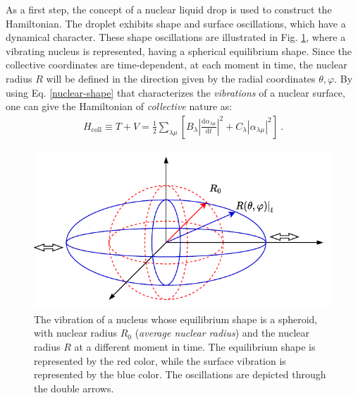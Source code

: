 As a first step, the concept of a nuclear liquid drop is used to construct the Hamiltonian. The droplet exhibits shape and surface oscillations, which have a dynamical character. These shape oscillations are illustrated in Fig. \ref{fig-nuclear-vibration}, where a vibrating nucleus is represented, having a spherical equilibrium shape. Since the collective coordinates are time-dependent, at each moment in time, the nuclear radius $R$ will be defined in the direction given by the radial coordinates $\theta,\varphi$. By using Eq. \ref{nuclear-shape} that characterizes the \emph{vibrations} of a nuclear surface, one can give the Hamiltonian of \emph{collective} nature as:
\begin{align}
    H_\text{coll}\equiv T+V=\frac{1}{2}\sum_{\lambda\mu}\left[B_\lambda\left|\frac{\text{d}\alpha_{\lambda\mu}}{\text{d}t}\right|^2+C_\lambda|\alpha_{\lambda\mu}|^2\right]\ .
    \label{collective-hamiltonian-stiffness-inertia}
\end{align}
\begin{figure}
    \centering
    \includegraphics[width=0.99\textwidth]{Chapters/Figures/shape_oscillations.pdf}
    \caption{The vibration of a nucleus whose equilibrium shape is a spheroid, with nuclear radius $R_0$ (\emph{average nuclear radius}) and the nuclear radius $R$ at a different moment in time. The equilibrium shape is represented by the red color, while the surface vibration is represented by the blue color. The oscillations are depicted through the double arrows.}
    \label{fig-nuclear-vibration}
\end{figure}

